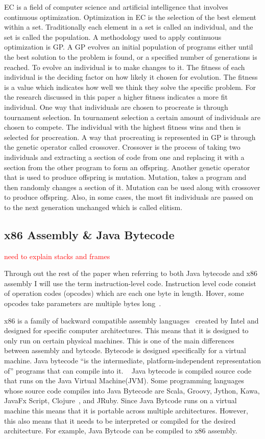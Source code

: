 \documentclass{sig-alternate}
\newcommand{\mycomment}[1]{\textcolor{red}{#1}}
\begin{document}
EC is a field of computer science and artificial intelligence that involves continuous optimization. Optimization in EC is the selection of the best element within a set. Traditionally each element in a set is called an individual, and the set is called the population. A methodology used to apply continuous optimization is GP. A GP evolves an initial population of programs either until the best solution to the problem is found, or a specified number of generations is reached. To evolve an individual is to make changes to it. The fitness of each individual is the deciding factor on how likely it chosen for evolution. The fitness is a value which indicates how well we think they solve the specific problem. For the research discussed in this paper a higher fitness indicates a more fit individual. One way that individuals are chosen to procreate is through tournament selection. In tournament selection a certain amount of individuals are chosen to compete. The individual with the highest fitness wins and then is selected for procreation. A way that procreating is represented in GP is through the genetic operator called crossover. Crossover is the process of taking two individuals and extracting a section of code from one and replacing it with a section from the other program to form an offspring. Another genetic operator that is used to produce offspring is mutation. Mutation, takes a program and then randomly changes a section of it. Mutation can be used along with crossover to produce offspring. Also, in some cases, the most fit individuals are passed on to the next generation unchanged which is called elitism.


\subsection{x86 Assembly \& Java Bytecode}

\mycomment{need to explain stacks and frames}

Through out the rest of the paper when referring to both Java bytecode and x86 assembly I will use the term instruction-level code. Instruction level code consist of operation codes (opcodes) which are each one byte in length. Hover, some opcodes take parameters are multiple bytes long~\cite{JavaBytecode:2014,x86tomachine:2013}. 

x86 is a family of backward compatible assembly languages~\cite{x86:2014} created by Intel and designed for specific computer architectures. This means that it is designed to only run on certain physical machines. This is one of the main differences between assembly and bytcode. Bytecode is designed specifically for a virtual machine. Java bytecode ``is the intermediate, platform-independent representation of'' programs that can compile into it. ~\cite{VIII:2011} Java bytecode is compiled source code that runs on the Java Virtual Machine(JVM). Some programming languages whose source code compiles into Java Bytecode are Scala, Groovy, Jython, Kawa, JavaFx Script, Clojure~\cite{FINCH:2011}, and JRuby.  Since Java Bytcode runs on a virtual machine this means that it is portable across multiple architectures. However, this also means that it needs to be interpreted or compiled for the desired architecture. For example, Java Bytcode can be compiled to x86 assembly.
\end{document}
